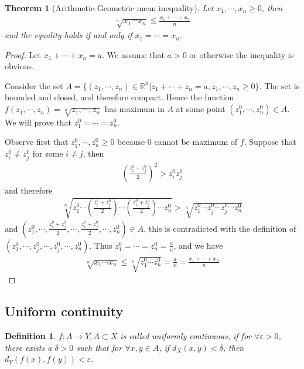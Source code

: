 \documentclass[12pt,leqno]{amsart}
\newtheorem{definition}{Definition}[section]
\newtheorem{theorem}{Theorem}[section]
\theoremstyle{definition}
\numberwithin{equation}{subsection}
\begin{document}
\begin{theorem}[Arithmetic-Geometric mean inequality]
Let $x_1,\cdots,x_n\geq 0$, then 
\begin{align*}
    \sqrt[n]{x_1 \cdots x_n}\leq \frac{x_1+\cdots+x_n}{n}
\end{align*}
and the equality holds if and only if $x_1=\cdots=x_n$.
\end{theorem}
\begin{proof}
Let $x_1+\cdots+x_n = a$. We assume that $a > 0$ or otherwise the inequality is obvious. 

Consider the set $A = \{(z_1,\cdots,z_n)\in\mathbb{R}^n|z_1+\cdots+z_n = a, z_1,\cdots,z_n\geq 0\}$. The set is bounded and closed, and therefore compact. Hence the function $f(z_1,\cdots,z_n) = \sqrt[n]{z_1,\cdots,z_n}$ has maximum in $A$ at some point $(z_1^0,\cdots,z_n^0)\in A$. We will prove that $z_1^0=\cdots=z_n^0$.

Observe first that $z_1^0,\cdots,z_n^0 \geq 0$ because $0$ cannot be maximum of $f$. Suppose that $z_i^0\neq z_j^0$ for some $i\neq j$, then 
\begin{align*}
    \left(\frac{z_i^0 + z_j^0}{2}\right)^2 > z_i^0 z_j^0
\end{align*}
and therefore
\begin{align*}
    \sqrt[n]{z_1^0\cdots\left(\frac{z_i^0 + z_j^0}{2}\right) \cdots \left(\frac{z_i^0 + z_j^0}{2}\right)\cdots  z_n^0} > \sqrt[n]{z_1^0\cdots z_j^0 \cdots z_j^0\cdots  z_n^0}
\end{align*}
and $\left( z_1^0,\cdots,\frac{z_i^0 + z_j^0}{2},\cdots,\frac{z_i^0 + z_j^0}{2},\cdots,z_n^0\right)\in A$, this is contradicted with the definition of $(z_1^0,\cdots,z_j^0,\cdots,z_j^0,\cdots,z_n^0)$. Thus $z_1^0 = \cdots = z_n^0 = \frac{a}{n}$, and we have 
\begin{align*}
    \sqrt[n]{x_1\cdots x_n} \leq \sqrt[n]{z_1^0 \cdots z_n^0} = \frac{a}{n} = \frac{x_1 + \cdots + x_n}{n}
\end{align*}
\end{proof}

\medskip

\subsection{Uniform continuity}
\begin{definition}
$f:A\to Y, A\subset X$ is called uniformly continuous, if for $\forall \varepsilon > 0$, there exists a $\delta > 0$ such that for $\forall x,y\in A$, if $d_X(x,y)<\delta$, then $d_Y(f(x),f(y))<\varepsilon$. 
\end{definition}
\end{document}
